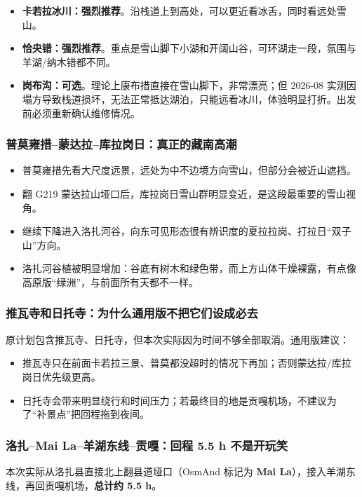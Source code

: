 \documentclass[10.5pt,a4paper]{ctexart}
\newcommand{\tagmust}{\textcolor{green!40!black}{\textbf{强烈推荐}}}
\newcommand{\tagopt}{\textcolor{blue!70!black}{\textbf{可选}}}
\begin{document}
\begin{itemize}
  \item \textbf{卡若拉冰川：}\tagmust。沿栈道上到高处，可以更近看冰舌，同时看远处雪山。
  \item \textbf{恰央错：}\tagmust。重点是雪山脚下小湖和开阔山谷，可环湖走一段，氛围与羊湖/纳木错都不同。
  \item \textbf{岗布沟：}\tagopt。理论上康布措直接在雪山脚下，非常漂亮；但 2026-08 实测因塌方导致栈道损坏，无法正常抵达湖泊，只能远看冰川，体验明显打折。出发前必须重新确认维修情况。
\end{itemize}

\subsubsection{普莫雍措--蒙达拉--库拉岗日：真正的藏南高潮}
\begin{itemize}
  \item 普莫雍措先看大尺度远景，远处为中不边境方向雪山，但部分会被近山遮挡。
  \item 翻 G219 蒙达拉山垭口后，库拉岗日雪山群明显变近，是这段最重要的雪山视角。
  \item 继续下降进入洛扎河谷，向东可见形态很有辨识度的夏拉拉岗、打拉日“双子山”方向。
  \item 洛扎河谷植被明显增加：谷底有树木和绿色带，而上方山体干燥裸露，有点像高原版“绿洲”，与前面所有天都不一样。
\end{itemize}

\subsubsection{推瓦寺和日托寺：为什么通用版不把它们设成必去}
原计划包含推瓦寺、日托寺，但本次实际因为时间不够全部取消。通用版建议：
\begin{itemize}
  \item 推瓦寺只在前面卡若拉三景、普莫都没超时的情况下再加；否则蒙达拉/库拉岗日优先级更高。
  \item 日托寺会带来明显绕行和时间压力；若最终目的地是贡嘎机场，不建议为了“补景点”把回程拖到夜间。
\end{itemize}

\subsubsection{洛扎--Mai La--羊湖东线--贡嘎：回程 5.5 h 不是开玩笑}
本次实际从洛扎县直接北上翻县道垭口（OsmAnd 标记为 \textbf{Mai La}），接入羊湖东线，再回贡嘎机场，\textbf{总计约 5.5 h}。
\end{document}
